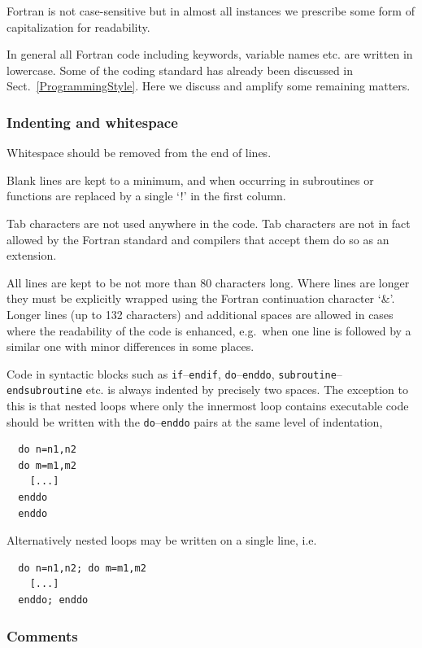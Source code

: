 \documentclass[\mydriver,12pt,twoside,notitlepage,a4paper]{article}
\newcommand{\code}[1]{\texttt{#1}}
\begin{document}
Fortran is not case-sensitive but in almost all instances we prescribe
some form of capitalization for readability.

In general all Fortran code including keywords, variable names etc. are
written in lowercase.
Some of the coding standard has already been discussed in
Sect.~\ref{ProgrammingStyle}.
Here we discuss and amplify some remaining matters.

\subsubsection{Indenting and whitespace}

Whitespace should be removed from the end of lines.

Blank lines are kept to a minimum, and when occurring in subroutines
or functions are replaced by a single `!' in the first column.

Tab characters are not used anywhere in the code.  Tab characters are
not in fact allowed by the Fortran standard and compilers that accept
them do so as an extension.

All lines are kept to be not more than 80 characters long.
Where lines are longer they must be explicitly wrapped using the
Fortran continuation character `\&'.
Longer lines (up to 132 characters) and additional spaces are allowed
in cases where the readability of the code is enhanced, e.g.\ when one
line is followed by a similar one with minor differences in some places.

Code in syntactic blocks such as \code{if}--\code{endif}, \code{do}--\code{enddo},
\code{subroutine}--\code{endsubroutine} etc. is always indented by precisely two spaces.
The exception to this is that nested loops where only the innermost loop
contains executable code should be written with the \code{do}--\code{enddo}
pairs at the same level of indentation,
\begin{verbatim}
  do n=n1,n2
  do m=m1,m2
    [...]
  enddo
  enddo
\end{verbatim}
Alternatively nested loops may be written on a single line, i.e.
\begin{verbatim}
  do n=n1,n2; do m=m1,m2
    [...]
  enddo; enddo
\end{verbatim}

\subsubsection{Comments}
\end{document}
